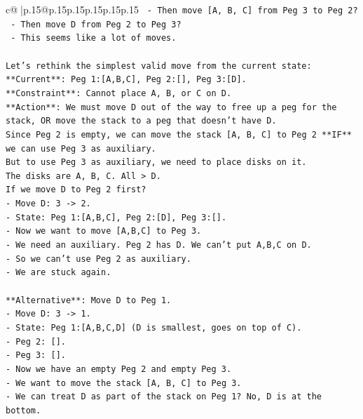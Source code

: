 \documentclass{article}
\begin{document}
{\begin{supertabular}{c@{$\;$}|p{.15\linewidth}@{}p{.15\linewidth}p{.15\linewidth}p{.15\linewidth}p{.15\linewidth}p{.15\linewidth}}
{{{\texttt{       {-} Then move {[}A, B, C{]} from Peg 3 to Peg 2?} \\
\texttt{       {-} Then move D from Peg 2 to Peg 3?} \\
\texttt{       {-} This seems like a lot of moves.} \\
\\ 
\texttt{Let's rethink the simplest valid move from the current state:} \\
\texttt{**Current**: Peg 1:{[}A,B,C{]}, Peg 2:{[}{]}, Peg 3:{[}D{]}.} \\
\texttt{**Constraint**: Cannot place A, B, or C on D.} \\
\texttt{**Action**: We must move D out of the way to free up a peg for the stack, OR move the stack to a peg that doesn't have D.} \\
\texttt{Since Peg 2 is empty, we can move the stack {[}A, B, C{]} to Peg 2 **IF** we can use Peg 3 as auxiliary.} \\
\texttt{But to use Peg 3 as auxiliary, we need to place disks on it.} \\
\texttt{The disks are A, B, C. All > D.} \\
\texttt{If we move D to Peg 2 first?} \\
\texttt{{-} Move D: 3 {-}> 2.} \\
\texttt{{-} State: Peg 1:{[}A,B,C{]}, Peg 2:{[}D{]}, Peg 3:{[}{]}.} \\
\texttt{{-} Now we want to move {[}A,B,C{]} to Peg 3.} \\
\texttt{{-} We need an auxiliary. Peg 2 has D. We can't put A,B,C on D.} \\
\texttt{{-} So we can't use Peg 2 as auxiliary.} \\
\texttt{{-} We are stuck again.} \\
\\ 
\texttt{**Alternative**: Move D to Peg 1.} \\
\texttt{{-} Move D: 3 {-}> 1.} \\
\texttt{{-} State: Peg 1:{[}A,B,C,D{]} (D is smallest, goes on top of C).} \\
\texttt{{-} Peg 2: {[}{]}.} \\
\texttt{{-} Peg 3: {[}{]}.} \\
\texttt{{-} Now we have an empty Peg 2 and empty Peg 3.} \\
\texttt{{-} We want to move the stack {[}A, B, C{]} to Peg 3.} \\
\texttt{{-} We can treat D as part of the stack on Peg 1? No, D is at the bottom.} \\
}}}
\end{supertabular}}
\end{document}
